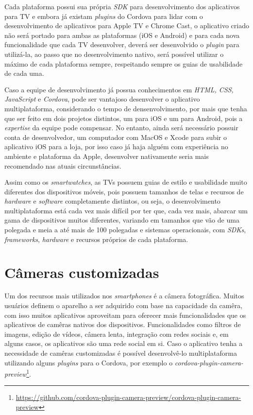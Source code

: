 Cada plataforma possui sua própria \textit{SDK} para desenvolvimento dos aplicativos para TV e embora já existam \textit{plugins} do Cordova para lidar com o desenvolvimento de aplicativos para Apple TV e Chrome Cast, o aplicativo criado não será portado para ambas as plataformas (iOS e Android) e para cada nova funcionalidade que cada TV desenvolver, deverá ser desenvolvido o \textit{plugin} para utilizá-la, ao passo que 
no desenvolvimento nativo, será possível utilizar o máximo de cada plataforma sempre, respeitando sempre os guias de usabilidade de cada uma. 

Caso a equipe de desenvolvimento já possua conhecimentos em \textit{HTML, CSS, JavaScript} e \textit{Cordova}, pode ser vantajoso desenvolver o aplicativo multiplataforma, considerando o tempo de densenvolvimento, por 
mais que tenha que ser feito em dois projetos distintos, um para iOS e um para Android, pois a \textit{expertise} da equipe pode compensar. No entanto, ainda será necessário possuir conta de desenvolvedor, um computador com 
MacOS e Xcode para subir o aplicativo iOS para a loja, por isso caso já haja alguém com experiência no ambiente e plataforma da Apple, desenvolver nativamente seria mais recomendado nas atuais circunstâncias. 

Assim como os \textit{smartwatches}, as TVs possuem guias de estilo e usabilidade muito diferentes dos dispositivos móveis, pois possuem tamanhos de telas e recursos de \textit{hardware} e \textit{software} completamente 
distintos, ou seja, o desenvolvimento multiplataforma está cada vez mais difícil por ter que, cada vez mais, abarcar um gama de dispositivos muitos diferentes, variando em tamanhos que vão de uma polegada e meia a
até mais de 100 polegadas e sistemas operacionais, com \textit{SDKs}, \textit{frameworks}, \textit{hardware} e recursos próprios de cada plataforma. 

\section{Câmeras customizadas} \label{subsubsec:customcamera}

Um dos recursos mais utilizados nos \textit{smartphones} é a câmera fotográfica. Muitos usuários definem o aparelho a ser adquirido com base na capacidade da camêra, com isso muitos aplicativos aproveitam para 
oferecer mais funcionalidades que os aplicativos de camêras nativos dos dispositivos. Funcionalidades como filtros de imagens, edição de vídeos, câmera lenta, integração com redes sociais e, em alguns casos, os aplicativos 
são uma rede social em si. Caso o aplicativo tenha a necessidade de camêras customizadas é possível desenvolvê-lo multiplataforma utilizando alguns \textit{plugins} para o Cordova, por exemplo o 
\textit{cordova-plugin-camera-preview}\footnote{\url{https://github.com/cordova-plugin-camera-preview/cordova-plugin-camera-preview}}.

